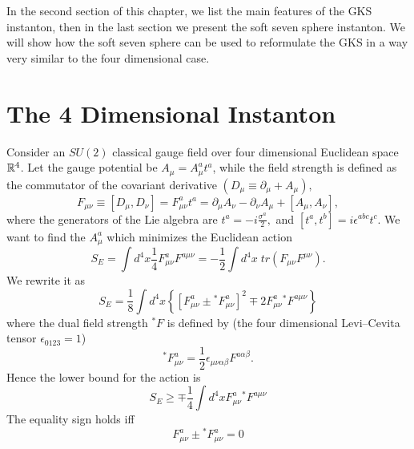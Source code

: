 \documentclass[a4paper,12pt]{book}
\begin{document}
In the second section of this chapter, we list the main features of the GKS
instanton, then in the last section we present the soft seven sphere
instanton. We will show how the soft seven sphere can be used to reformulate
the GKS in a way very similar to the four dimensional case.

\section{The 4 Dimensional Instanton}

Consider an $SU\left( 2\right) $ classical gauge field over four dimensional
Euclidean space $\Bbb{R}^{4}$. Let the gauge potential be $A_{\mu }=A_{\mu
}^{a}t^{a}$, while the field strength is defined as the commutator of the
covariant derivative $\left( D_{\mu }\equiv \partial _{\mu }+A_{\mu }\right)
,$%
\begin{equation}
F_{\mu \nu }\equiv \left[ D_{\mu },D_{\nu }\right] =F_{\mu \nu
}^{a}t^{a}=\partial _{\mu }A_{\nu }-\partial _{\nu }A_{\mu }+\left[ A_{\mu
},A_{\nu }\right] ,
\end{equation}
where the generators of the Lie algebra are $t^{a}=-i\frac{\sigma ^{a}}{2},$
and $\left[ t^{a},t^{b}\right] =i\epsilon ^{abc}t^{c}$. We want to find the $%
A_{\mu }^{a}$ which minimizes the Euclidean action 
\begin{equation}
S_{E}=\int d^{4}x\frac{1}{4}F_{\mu \nu }^{a}F^{a\mu \nu }=-\frac{1}{2}\int
d^{4}x\;tr\left( F_{\mu \nu }F^{\mu \nu }\right) .
\end{equation}
We rewrite it as 
\begin{equation}
S_{E}=\frac{1}{8}\int d^{4}x\left\{ \left[ F_{\mu \nu }^{a}\pm {}^{*}F_{\mu
\nu }^{a}\right] ^{2}\mp 2F_{\mu \nu }^{a}{}^{*}F^{a\mu \nu }\right\}
\label{bogo4}
\end{equation}
where the dual field strength $^{*}F$ is defined by (the four dimensional
Levi--Cevita tensor $\epsilon _{0123}=1$) 
\begin{equation}
^{\ast }F_{\mu \nu }^{a}=\frac{1}{2}\epsilon _{\mu \nu \alpha \beta
}F^{a\alpha \beta }.
\end{equation}
Hence the lower bound for the action is 
\begin{equation}
S_{E}\geq \mp \frac{1}{4}\int d^{4}xF_{\mu \nu }^{a}{}^{*}F^{a\mu \nu }
\label{lowbou}
\end{equation}
The equality sign holds iff 
\begin{equation}
F_{\mu \nu }^{a}\pm {}^{*}F_{\mu \nu }^{a}=0  \label{seldua}
\end{equation}
\end{document}
